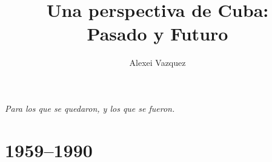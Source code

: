\documentclass[10pt]{book}
\begin{document}
\frontmatter

\title{Una perspectiva de Cuba:\\Pasado y Futuro}
\author{Alexei Vazquez}
\date{}
\maketitle

\thispagestyle{empty}
\vspace*{\fill}
\begin{center}
{\itshape Para los que se quedaron, y los que se fueron.}
\end{center}
\vspace*{\fill}
\clearpage




\setcounter{tocdepth}{0}
\tableofcontents

\mainmatter

\part{1959--1990}






\end{document}
